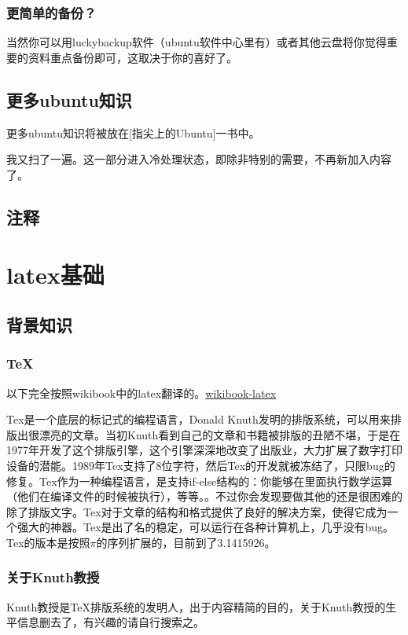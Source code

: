 \documentclass[12pt,oneside]{book}
\begin{document}
\begin{common-format}
\subsection{更简单的备份？}
当然你可以用luckybackup软件（ubuntu软件中心里有）或者其他云盘将你觉得重要的资料重点备份即可，这取决于你的喜好了。

\section{更多ubuntu知识}
更多ubuntu知识将被放在[指尖上的Ubuntu]一书中。

我又扫了一遍。这一部分进入冷处理状态，即除非特别的需要，不再新加入内容了。


\section{注释}
\showendnotes



\chapter{latex基础}
\section{背景知识}
\subsection{TeX}
以下完全按照wikibook中的latex翻译的。\href{http://en.wikibooks.org/wiki/LaTeX/Introduction}{wikibook-latex}

Tex是一个底层的标记式的编程语言，Donald Knuth发明的排版系统，可以用来排版出很漂亮的文章。当初Knuth看到自己的文章和书籍被排版的丑陋不堪，于是在1977年开发了这个排版引擎，这个引擎深深地改变了出版业，大力扩展了数字打印设备的潜能。1989年Tex支持了8位字符，然后Tex的开发就被冻结了，只限bug的修复。Tex作为一种编程语言，是支持if-else结构的：你能够在里面执行数学运算（他们在编译文件的时候被执行），等等。。不过你会发现要做其他的还是很困难的除了排版文字。Tex对于文章的结构和格式提供了良好的解决方案，使得它成为一个强大的神器。Tex是出了名的稳定，可以运行在各种计算机上，几乎没有bug。Tex的版本是按照$\pi$的序列扩展的，目前到了3.1415926。

\subsection{关于Knuth教授}
Knuth教授是\TeX 排版系统的发明人，出于内容精简的目的，关于Knuth教授的生平信息删去了，有兴趣的请自行搜索之。


\end{common-format}
\end{document}
